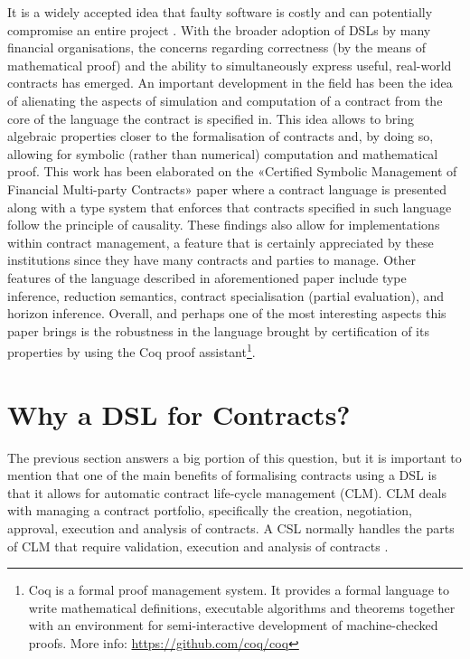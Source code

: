 \documentclass{ituthesis}
\begin{document}
It is a widely accepted idea that faulty software is costly and can potentially compromise an entire project \cite{expensivesoftware}. With the broader adoption of DSLs by many financial organisations, the concerns regarding correctness (by the means of mathematical proof) and the ability to simultaneously express useful, real-world contracts has emerged. An important development in the field has been the idea of alienating the aspects of simulation and computation of a contract from the core of the language the contract is specified in. This idea allows to bring algebraic properties closer to the formalisation of contracts and, by doing so, allowing for symbolic (rather than numerical) computation and mathematical proof. This work has been elaborated on the «Certified Symbolic Management of Financial Multi-party Contracts» paper \cite{bahr2015certified} where a contract language is presented along with a type system that enforces that contracts specified in such language follow the principle of causality. These findings also allow for implementations within contract management, a feature that is certainly appreciated by these institutions since they have many contracts and parties to manage. Other features of the language described in aforementioned paper include type inference, reduction semantics, contract specialisation (partial evaluation), and horizon inference. Overall, and perhaps one of the most interesting aspects this paper brings is the robustness in the language brought by certification of its properties by using the Coq proof
assistant\footnote{Coq is a formal proof management system. It provides a formal language to write mathematical definitions, executable algorithms and theorems together with an environment for semi-interactive development of machine-checked proofs. More info: \url{https://github.com/coq/coq}}.

\section{Why a DSL for Contracts?}
The previous section answers a big portion of this question, but it is important to mention that one of the main benefits of formalising contracts using a DSL is that it allows for automatic contract life-cycle management (CLM). CLM deals with managing a contract portfolio, specifically the creation, negotiation, approval, execution and analysis of contracts. A CSL normally handles the parts of CLM that require validation, execution and analysis of contracts \cite{hvitved2011contract}.
\end{document}
